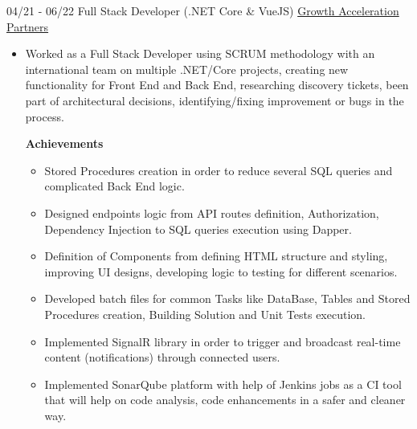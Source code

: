 \documentclass[letterpaper]{twentysecondcv} %
\begin{document}
\begin{twenty}
{\begin{itemize}
            \end{itemize}
        }
        
        \twentyitem
        {04/21 - 06/22}
        {Full Stack Developer (.NET Core \& VueJS)}
        { \href{https://www.growthaccelerationpartners.com/}{Growth Acceleration Partners}}
        {
            \begin{itemize}
                \item Worked as a Full Stack Developer using SCRUM methodology with an international team on multiple .NET/Core projects, creating new functionality for Front End and Back End, researching discovery tickets, been part of architectural decisions, identifying/fixing improvement or bugs in the process.
                
                \textbf{Achievements}
                \begin{itemize}

                    \item Stored Procedures creation in order to reduce several SQL queries and complicated Back End logic. %
                    
                    \item Designed endpoints logic from API routes definition, Authorization, Dependency Injection to SQL queries execution using Dapper.
                    
                    \item Definition of Components from defining HTML structure and styling, improving UI designs, developing logic to testing for different scenarios.  %
                    
                    \item Developed batch files for common Tasks like DataBase, Tables and Stored Procedures creation, Building Solution and Unit Tests execution.
                    
                    \item Implemented SignalR library in order to trigger and broadcast real-time content (notifications) through connected users.  %
                    
                    \item Implemented SonarQube platform with help of Jenkins jobs as a CI tool that will help on code analysis, code enhancements in a safer and cleaner way.  %
                    

\end{itemize}
\end{itemize}}
\end{twenty}
\end{document}

